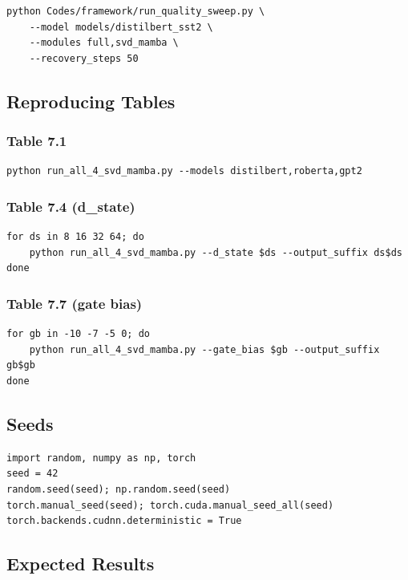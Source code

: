 \begin{lstlisting}
python Codes/framework/run_quality_sweep.py \
    --model models/distilbert_sst2 \
    --modules full,svd_mamba \
    --recovery_steps 50
\end{lstlisting}

\subsection{Reproducing Tables}

\subsubsection{Table 7.1}
\begin{lstlisting}
python run_all_4_svd_mamba.py --models distilbert,roberta,gpt2
\end{lstlisting}

\subsubsection{Table 7.4 (d\_state)}
\begin{lstlisting}
for ds in 8 16 32 64; do
    python run_all_4_svd_mamba.py --d_state $ds --output_suffix ds$ds
done
\end{lstlisting}

\subsubsection{Table 7.7 (gate bias)}
\begin{lstlisting}
for gb in -10 -7 -5 0; do
    python run_all_4_svd_mamba.py --gate_bias $gb --output_suffix gb$gb
done
\end{lstlisting}

\subsection{Seeds}

\begin{lstlisting}
import random, numpy as np, torch
seed = 42
random.seed(seed); np.random.seed(seed)
torch.manual_seed(seed); torch.cuda.manual_seed_all(seed)
torch.backends.cudnn.deterministic = True
\end{lstlisting}

\subsection{Expected Results}

